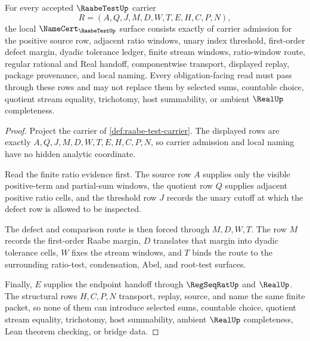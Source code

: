\begin{theorem}
\label{thm:raabe-test-namecert-obligations}
For every accepted $\RaabeTestUp$ carrier
$$
R=(A,Q,J,M,D,W,T,E,H,C,P,N),
$$
the local $\NameCert_{\RaabeTestUp}$ surface consists exactly of carrier admission for the positive source row, adjacent ratio windows, unary index threshold, first-order defect margin, dyadic tolerance ledger, finite stream windows, ratio-window route, regular rational and Real handoff, componentwise transport, displayed replay, package provenance, and local naming. Every obligation-facing read must pass through these rows and may not replace them by selected sums, countable choice, quotient stream equality, trichotomy, host summability, or ambient $\RealUp$ completeness.
\end{theorem}
\begin{proof}
Project the carrier of \autoref{def:raabe-test-carrier}. The displayed rows are exactly $A,Q,J,M,D,W,T,E,H,C,P,N$, so carrier admission and local naming have no hidden analytic coordinate.

Read the finite ratio evidence first. The source row $A$ supplies only the visible positive-term and partial-sum windows, the quotient row $Q$ supplies adjacent positive ratio cells, and the threshold row $J$ records the unary cutoff at which the defect row is allowed to be inspected.

The defect and comparison route is then forced through $M,D,W,T$. The row $M$ records the first-order Raabe margin, $D$ translates that margin into dyadic tolerance cells, $W$ fixes the stream windows, and $T$ binds the route to the surrounding ratio-test, condensation, Abel, and root-test surfaces.

Finally, $E$ supplies the endpoint handoff through $\RegSeqRatUp$ and $\RealUp$. The structural rows $H,C,P,N$ transport, replay, source, and name the same finite packet, so none of them can introduce selected sums, countable choice, quotient stream equality, trichotomy, host summability, ambient $\RealUp$ completeness, Lean theorem checking, or bridge data.
\end{proof}

